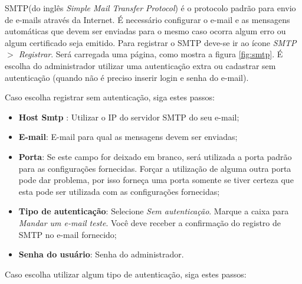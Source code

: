 SMTP(do inglês \textit{Simple Mail Transfer Protocol}) é o protocolo padrão para envio de e-mails através da Internet. É necessário configurar o e-mail e as mensagens automáticas que devem ser enviadas para o mesmo caso ocorra algum erro ou algum certificado seja emitido.
Para registrar o SMTP deve-se ir ao ícone \textit{SMTP $>$ Registrar}. Será carregada uma página, como mostra a figura \ref{fig:smtp}. É escolha do administrador utilizar uma autenticação extra ou cadastrar sem autenticação (quando não é preciso inserir login e senha do e-mail). 

Caso escolha registrar sem autenticação, siga estes passos:

\begin{itemize}
	\item \textbf{Host Smtp} : Utilizar o IP do servidor SMTP do seu e-mail;
	\item \textbf{E-mail}: E-mail para qual as mensagens devem ser enviadas;
	\item \textbf{Porta}: Se este campo for deixado em branco, será utilizada a porta padrão para as configurações fornecidas. Forçar a utilização de alguma outra porta pode dar problema, por isso forneça uma porta somente se tiver certeza que esta pode ser utilizada com as configurações fornecidas;
    \item \textbf{Tipo de autenticação}: Selecione \textit{Sem autenticação}. Marque a caixa para \textit{Mandar um e-mail teste}. Você deve receber a confirmação do registro de SMTP no e-mail fornecido;
    \item \textbf{Senha do usuário}: Senha do administrador.
\end{itemize}

Caso escolha utilizar algum tipo de autenticação, siga estes passos:


